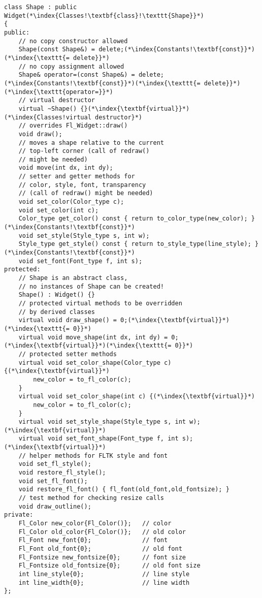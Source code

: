 \documentclass[10pt]{article}
\begin{document}
\begin{lstlisting}
class Shape : public Widget(*\index{Classes!\textbf{class}!\texttt{Shape}}*)
{
public:
    // no copy constructor allowed
    Shape(const Shape&) = delete;(*\index{Constants!\textbf{const}}*)(*\index{\texttt{= delete}}*)
    // no copy assignment allowed
    Shape& operator=(const Shape&) = delete;(*\index{Constants!\textbf{const}}*)(*\index{\texttt{= delete}}*)(*\index{\texttt{operator=}}*)
    // virtual destructor
    virtual ~Shape() {}(*\index{\textbf{virtual}}*)(*\index{Classes!virtual destructor}*)
    // overrides Fl_Widget::draw()
    void draw();
    // moves a shape relative to the current
    // top-left corner (call of redraw()
    // might be needed)
    void move(int dx, int dy);
    // setter and getter methods for
    // color, style, font, transparency
    // (call of redraw() might be needed)
    void set_color(Color_type c);
    void set_color(int c);
    Color_type get_color() const { return to_color_type(new_color); }(*\index{Constants!\textbf{const}}*)
    void set_style(Style_type s, int w);
    Style_type get_style() const { return to_style_type(line_style); }(*\index{Constants!\textbf{const}}*)
    void set_font(Font_type f, int s);
protected:
    // Shape is an abstract class,
    // no instances of Shape can be created!
    Shape() : Widget() {}
    // protected virtual methods to be overridden
    // by derived classes
    virtual void draw_shape() = 0;(*\index{\textbf{virtual}}*)(*\index{\texttt{= 0}}*)
    virtual void move_shape(int dx, int dy) = 0;(*\index{\textbf{virtual}}*)(*\index{\texttt{= 0}}*)
    // protected setter methods
    virtual void set_color_shape(Color_type c) {(*\index{\textbf{virtual}}*)
        new_color = to_fl_color(c);
    }
    virtual void set_color_shape(int c) {(*\index{\textbf{virtual}}*)
        new_color = to_fl_color(c);
    }
    virtual void set_style_shape(Style_type s, int w);(*\index{\textbf{virtual}}*)
    virtual void set_font_shape(Font_type f, int s);(*\index{\textbf{virtual}}*)
    // helper methods for FLTK style and font
    void set_fl_style();
    void restore_fl_style();
    void set_fl_font();
    void restore_fl_font() { fl_font(old_font,old_fontsize); }
    // test method for checking resize calls
    void draw_outline();
private:
    Fl_Color new_color{Fl_Color()};   // color
    Fl_Color old_color{Fl_Color()};   // old color
    Fl_Font new_font{0};              // font
    Fl_Font old_font{0};              // old font
    Fl_Fontsize new_fontsize{0};      // font size
    Fl_Fontsize old_fontsize{0};      // old font size
    int line_style{0};                // line style
    int line_width{0};                // line width
};
\end{lstlisting}
\end{document}
